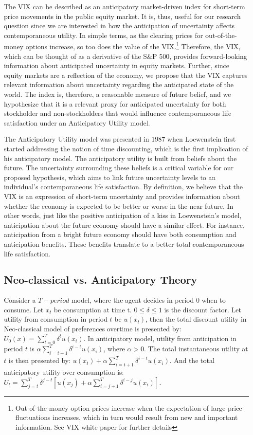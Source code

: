 \documentclass[11pt,a4paper,oldfontcommands]{memoir}
\begin{document}
{The VIX can be described as an anticipatory market-driven index for short-term price movements in the public equity market. It is, thus, useful for our research question since we are interested in how the anticipation of uncertainty affects contemporaneous utility. In simple terms, as the clearing prices for out-of-the-money options increase, so too does the value of the VIX.\footnote{Out-of-the-money option prices increase when the expectation of large price fluctuations increases, which in turn would result from new and important information. See VIX white paper for further details} Therefore, the VIX, which can be thought of as a derivative of the S&P 500, provides forward-looking information about anticipated uncertainty in equity markets. Further, since equity markets are a reflection of the economy, we propose that the VIX captures relevant information about uncertainty regarding the anticipated state of the world. The index is, therefore, a reasonable measure of future belief, and we hypothesize that it is a relevant proxy for anticipated uncertainty for both stockholder and non-stockholders that would influence contemporaneous life satisfaction under an Anticipatory Utility model.

The Anticipatory Utility model was presented in 1987 when Loewenstein first started addressing the notion of time discounting, which is the first implication of his anticipatory model. The anticipatory utility is built from beliefs about the future. The uncertainty surrounding these beliefs is a critical variable for our proposed hypothesis, which aims to link future uncertainty levels to an individual's contemporaneous life satisfaction. By definition, we believe that the VIX is an expression of short-term uncertainty and provides information about whether the economy is expected to be better or worse in the near future. In other words, just like the positive anticipation of a kiss in Loewenstein's model, anticipation about the future economy should have a similar effect. For instance, anticipation from a bright future economy should have both consumption and anticipation benefits. These benefits translate to a better total contemporaneous life satisfaction.

\subsection{Neo-classical vs. Anticipatory Theory}

Consider a $T-period$ model, where the agent decides in period $0$ when to consume. Let $x_t$ be consumption at time t. $0 \leq \delta \leq 1$ is the discount factor. Let utility from consumption in period $t$ be $u(x_t)$, then the total discount utility in Neo-classical model of preferences overtime is presented by: $U_0(x)= \sum_{t=0}^T \delta^t u(x_t)$. In anticipatory model, utility from anticipation in period $t$ is $\alpha \sum_{i=t+1}^T \delta^{i-t}u(x_i)$, where $\alpha > 0$. The total instantaneous utility at $t$ is then presented by: $u(x_t) + \alpha \sum_{i=t+1}^T \delta^{i-t}u(x_i)$. And the total anticipatory utility over consumption is: $U_t=\sum_{j=t}^T \delta^{j-t}[u(x_j)+\alpha \sum_{i=j+1}^T \delta^{i-j}u(x_i)]$.

}
\end{document}
